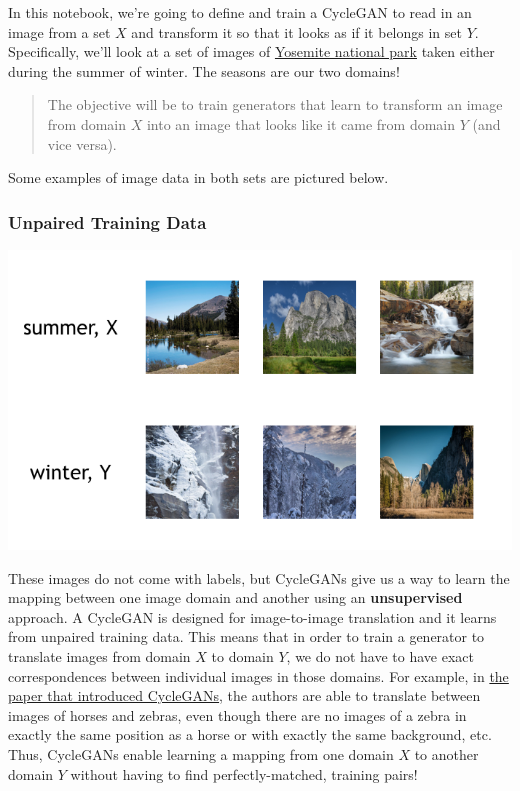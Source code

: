 In this notebook, we're going to define and train a CycleGAN to read in
an image from a set \(X\) and transform it so that it looks as if it
belongs in set \(Y\). Specifically, we'll look at a set of images of
\href{https://en.wikipedia.org/wiki/Yosemite_National_Park}{Yosemite
national park} taken either during the summer of winter. The seasons are
our two domains!

\begin{quote}
The objective will be to train generators that learn to transform an
image from domain \(X\) into an image that looks like it came from
domain \(Y\) (and vice versa).
\end{quote}
Some examples of image data in both sets are pictured below.
\subsubsection{Unpaired Training Data}

\includegraphics[width=1\linewidth]{img//genAdvNet//image2image/XY_season_images.png}

These images do not come with labels, but CycleGANs give us a way to
learn the mapping between one image domain and another using an
\textbf{unsupervised} approach. A CycleGAN is designed for
image-to-image translation and it learns from unpaired training data.
This means that in order to train a generator to translate images from
domain \(X\) to domain \(Y\), we do not have to have exact
correspondences between individual images in those domains. For example,
in \href{https://arxiv.org/abs/1703.10593}{the paper that introduced
CycleGANs}, the authors are able to translate between images of horses
and zebras, even though there are no images of a zebra in exactly the
same position as a horse or with exactly the same background, etc. Thus,
CycleGANs enable learning a mapping from one domain \(X\) to another
domain \(Y\) without having to find perfectly-matched, training pairs!

